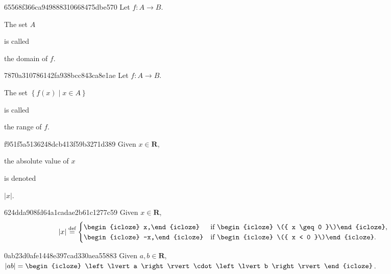 \begin{note}{65568f366ca949888310668475dbe570}
    Let \({ f : A \to B }\).
    \begin{icloze}{2}The set \({ A }\)\end{icloze} is called \begin{icloze}{1}the domain of \({ f }\).\end{icloze}
\end{note}

\begin{note}{7870a310786142fa938bcc843ca8e1ae}
    Let \({ f : A \to B }\).
    \begin{icloze}{2}The set \({ \left\{ f(x) \mid x \in A \right\} }\)\end{icloze} is called \begin{icloze}{1}the range of \({ f }\).\end{icloze}
\end{note}

\begin{note}{f951f5a5136248dcb413f59b3271d389}
    Given \({ x \in \mathbf{R} }\), \begin{icloze}{2}the absolute value of \({ x }\)\end{icloze} is denoted \begin{icloze}{1}\({ \left\lvert x \right\rvert }\).\end{icloze}
\end{note}

\begin{note}{624dda908fd64a1cadae2b61c1277c59}
    Given \({ x \in \mathbf{R} }\),
    \[
        \left\lvert x \right\rvert \overset{\text{def}}= \begin{cases}
            \begin{icloze}{1}x,\end{icloze} & \text{if \begin{icloze}{2}\({ x \geq 0 }\)\end{icloze}}, \\
            \begin{icloze}{1}-x,\end{icloze} & \text{if \begin{icloze}{2}\({ x < 0 }\)\end{icloze}}.
        \end{cases}
    \]
\end{note}

\begin{note}{0ab23d0afe1448e397cad330aea55883}
    Given \({ a, b \in \mathbf{R} }\), \quad \({ \left\lvert ab \right\rvert = \begin{icloze}{1}\left\lvert a \right\rvert \cdot \left\lvert b \right\rvert\end{icloze} }\).
\end{note}


